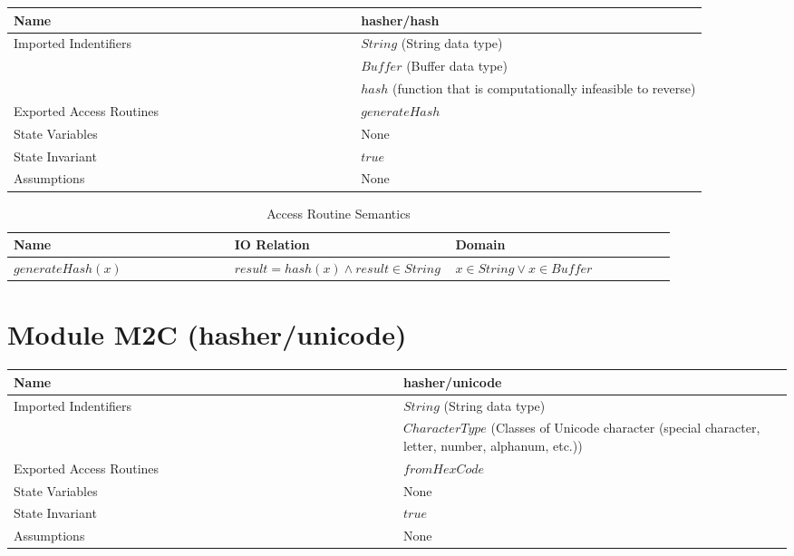 \documentclass[12pt]{article}
\begin{document}
\begin{table}[!htbp]
\begin{tabular}{|p{0.5\linewidth} | p{0.5\linewidth}|}
\hline
Name & hasher/hash \\
\hline
Imported Indentifiers & $String$ (String data type) \\
& $Buffer$ (Buffer data type) \\
& $hash$ (function that is computationally infeasible to reverse) \\
\hline
Exported Access Routines & $generateHash$ \\
\hline
State Variables & None \\
\hline
State Invariant & $true$ \\
\hline
Assumptions & None \\
\hline
\end{tabular}
\end{table}

\begin{table}[!htbp]
\caption{Access Routine Semantics}
\begin{tabular}{|p{0.33\linewidth} | p{0.33\linewidth}|p{0.33\linewidth}|}
\hline
Name & IO Relation & Domain \\
\hline
$generateHash(x)$ & $result = hash(x) \land result \in String$ & $x \in String \lor x \in Buffer$ \\
\hline
\end{tabular}
\end{table}

\newpage
\section{Module M2C (hasher/unicode)}

\begin{table}[!htbp]
\begin{tabular}{|p{0.5\linewidth} | p{0.5\linewidth}|}
\hline
Name & hasher/unicode \\
\hline
Imported Indentifiers & $String$ (String data type) \\
& $CharacterType$ (Classes of Unicode character (special character, letter, number, alphanum, etc.)) \\
\hline
Exported Access Routines & $fromHexCode$ \\
\hline
State Variables & None \\
\hline
State Invariant & $true$ \\
\hline
Assumptions & None \\
\hline
\end{tabular}
\end{table}
\end{document}
